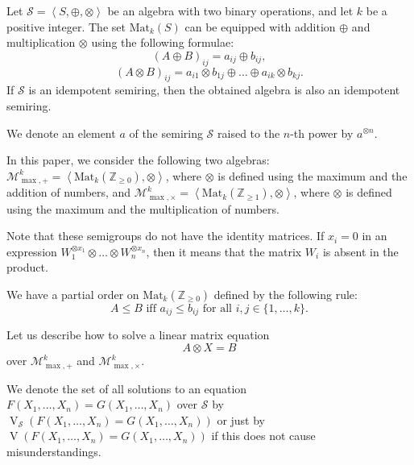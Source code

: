 \documentclass[reqno,12pt]{amsart}
\theoremstyle{definition}
\newcommand{\Mat}{\mathrm{Mat}}
\newcommand{\MP}{\mathcal{M}_{\max, {+}}^k}
\newcommand{\MT}{\mathcal{M}_{\max, {\times}}^k}
\DeclareMathOperator{\V}{\mathrm{V}}
\begin{document}
Let $\mathcal{S} = \left\langle S, \oplus, \otimes\right\rangle$ be an algebra with two binary operations, and let $k$ be a positive integer. The set $\Mat_k(S)$ can be equipped with addition $\oplus$ and multiplication $\otimes$ using the following formulae:
$$
    (A \oplus B)_{ij} = a_{ij} \oplus b_{ij},
$$
$$
    (A \otimes B)_{ij} = a_{i1} \otimes b_{1j} \oplus \dots \oplus a_{ik} \otimes b_{kj}.
$$
If $\mathcal{S}$ is an idempotent semiring, then the obtained algebra is also an idempotent semiring.

We denote an element $a$ of the semiring $\mathcal{S}$ raised to the $n$-th power by $a^{\otimes n}$. 

In this paper, we consider the following two algebras:
$\MP = \left<\Mat_k(\mathbb{Z}_{\geq 0}), \otimes\right>$, where $\otimes$ is defined using the maximum and the addition of numbers, and $\MT = \left<\Mat_k(\mathbb{Z}_{\geq 1}), \otimes\right>$, where $\otimes$ is defined using the maximum and the multiplication of numbers.

Note that these semigroups do not have the identity matrices. 
If $x_i = 0$ in an expression $W_1^{\otimes x_1} \otimes \ldots \otimes  W_n^{\otimes x_n}$, 
then it means that the matrix $W_i$ is absent in the product.

We have a partial order on $\Mat_k(\mathbb{Z}_{{\geq 0}})$ defined by the following rule:
$$
    A \leq B \text{ iff } a_{ij} \leq b_{ij} \text{ for all } i, j \in \{1, \ldots, k\}.
$$

Let us describe how to solve a linear matrix equation
\begin{equation}\label{MatLinEq}
A \otimes X = B
\end{equation}over
$\MP$ and $\MT$.

We denote the set of all solutions to an equation $F(X_1, \ldots, X_n) = G(X_1, \ldots, X_n)$
over $\mathcal{S}$ by $\V_{\mathcal{S}}(F(X_1, \ldots, X_n) = G(X_1, \ldots, X_n))$ or 
just by $\V(F(X_1, \ldots, X_n) = G(X_1, \ldots, X_n))$ if this does not cause misunderstandings.
\end{document}
